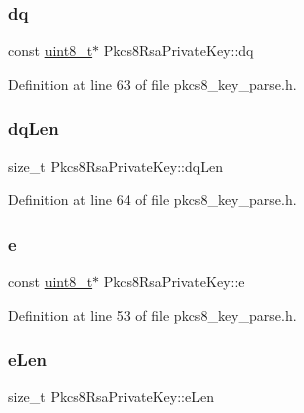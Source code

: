 \subsubsection{\texorpdfstring{dq}{dq}}
{\footnotesize\ttfamily const \hyperlink{stdint_8h_aba7bc1797add20fe3efdf37ced1182c5}{uint8\+\_\+t}$\ast$ Pkcs8\+Rsa\+Private\+Key\+::dq}



Definition at line 63 of file pkcs8\+\_\+key\+\_\+parse.\+h.

\mbox{\label{structPkcs8RsaPrivateKey_a594a1b4818730a79d59b9023a00227dd}} 
\subsubsection{\texorpdfstring{dq\+Len}{dqLen}}
{\footnotesize\ttfamily size\+\_\+t Pkcs8\+Rsa\+Private\+Key\+::dq\+Len}



Definition at line 64 of file pkcs8\+\_\+key\+\_\+parse.\+h.

\mbox{\label{structPkcs8RsaPrivateKey_a2946cc6004722d2074d3b267e97daef8}} 
\subsubsection{\texorpdfstring{e}{e}}
{\footnotesize\ttfamily const \hyperlink{stdint_8h_aba7bc1797add20fe3efdf37ced1182c5}{uint8\+\_\+t}$\ast$ Pkcs8\+Rsa\+Private\+Key\+::e}



Definition at line 53 of file pkcs8\+\_\+key\+\_\+parse.\+h.

\mbox{\label{structPkcs8RsaPrivateKey_a899452f1ccd061c9ff81517a441b3299}} 
\subsubsection{\texorpdfstring{e\+Len}{eLen}}
{\footnotesize\ttfamily size\+\_\+t Pkcs8\+Rsa\+Private\+Key\+::e\+Len}



